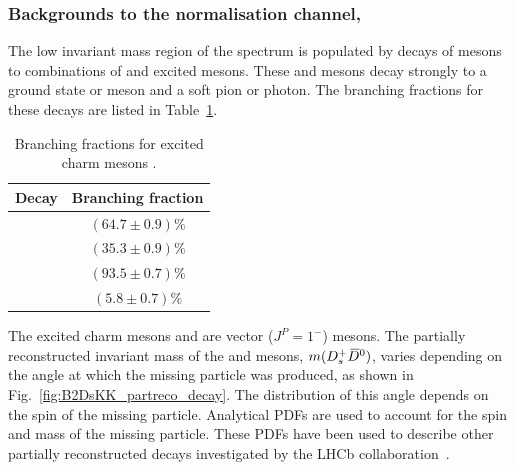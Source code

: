 \subsubsection{Backgrounds to the normalisation channel, \decay{\Bp}{\Dsp\Dzb}}
\label{sec:B2DsKK_norm_partreco}

The low invariant mass region of the \Dsp\Dzb spectrum is populated by decays of \Bp mesons to combinations of \D and excited \D mesons. These \Dstarzb and \Dss mesons decay strongly to a ground state \Dzb or \Dsp meson and a soft pion or photon. The branching fractions for these decays are listed in Table~\ref{tab:dstar_BFs}.


\begin{table}[h]
\centering
\begin{tabular}{ l c }

\hline
Decay                           & Branching fraction \\ 
\hline
\decay{\Dstarzb}{\Dzb\Pgamma}   &   $(64.7\pm0.9)\%$ \\
\decay{\Dstarzb}{\Dzb\piz}      &   $(35.3\pm0.9)\%$ \\
\decay{\Dssp}{\Dsp\Pgamma}      &   $(93.5\pm0.7)\%$ \\
\decay{\Dssp}{\Dsp\piz}         &    $(5.8\pm0.7)\%$ \\
\hline

\end{tabular}  
\caption{Branching fractions for excited charm mesons \cite{PDG2016}. } 
\label{tab:dstar_BFs}
\end{table}
The excited charm mesons \Dstarzb and \Dss are vector ($J^{P} = 1^{-}$) mesons. The partially reconstructed invariant mass of the \Dsp and \Dzb mesons, $m({{D}^+_{s}}{{\kern 0.2em\overline{\kern -0.2em D}{}}{}^0})$, varies depending on the angle at which the missing particle was produced, as shown in Fig.~\ref{fig:B2DsKK_partreco_decay}. The distribution of this angle depends on the spin of the missing particle. 
Analytical PDFs are used to account for the spin and mass of the missing particle. These PDFs have been used to describe other partially reconstructed  decays investigated by the LHCb collaboration~\cite{LHCb-PAPER-2017-021}. 

